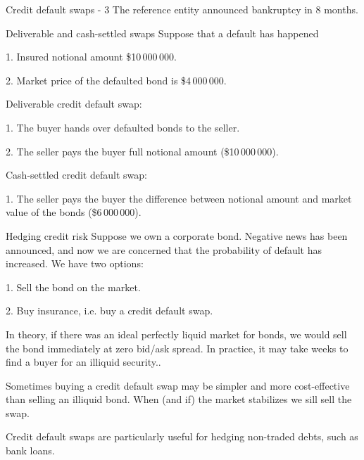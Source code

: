 \documentclass{beamer}
\begin{document}
\begin{frame}{Credit default swaps - 3}
\justify
The reference entity announced bankruptcy in 8 months.

\justify
\centering
{}
\end{frame}



\begin{frame}{Deliverable and cash-settled swaps}
\justify
Suppose that a default has happened

1. Insured notional amount \$10\,000\,000.

2. Market price of the defaulted bond is \$4\,000\,000.

\justify
\alert{Deliverable} credit default swap:

1. The buyer hands over defaulted bonds to the seller.

2. The seller pays the buyer full notional amount (\$10\,000\,000).

\justify
\alert{Cash-settled} credit default swap:

1. The seller pays the buyer the difference between notional amount and market value of the bonds  (\$6\,000\,000).

\end{frame}



\begin{frame}{Hedging credit risk}
\justify
Suppose we own a corporate bond. Negative news has been announced, and now we are concerned that the probability of default has increased. We have two options:

1. Sell the bond on the market.

2. Buy insurance, i.e. buy a credit default swap.

\justify
In theory, if there was an ideal perfectly liquid market for bonds, we would sell the bond immediately at zero bid/ask spread. In practice, it may take weeks to find a buyer for an illiquid security..

\justify
Sometimes buying a credit default swap may be simpler and more cost-effective than selling an illiquid bond. When (and if) the market stabilizes we sill sell the swap.

\justify
Credit default swaps are particularly useful for hedging non-traded debts, such as bank loans.
\end{frame}
\end{document}
